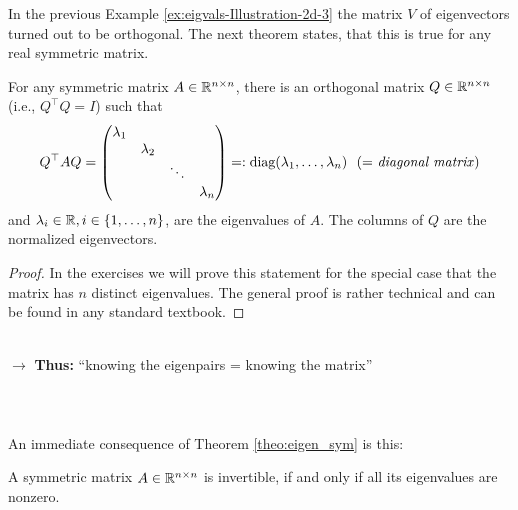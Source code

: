 \begin{frame}
In the previous Example \ref{ex:eigvals-Illustration-2d-3} the matrix $V$ of eigenvectors turned out to be orthogonal. The next theorem states, that this is true for any real symmetric matrix.
\begin{theo}\label{theo:eigen_sym}
	For any symmetric matrix $A\in{\mathbb{R}}^{n\times n}$, there is an orthogonal matrix $Q\in{\mathbb{R}}^{n\times n}$ (i.e., $Q^\top Q=I$) such that
	$$
	Q^\top AQ=\begin{pmatrix}
	\lambda_1 \\
	&\lambda_2\\
	&&\ddots\\
	&&&\lambda_n
	\end{pmatrix} =: \text{diag}(\lambda_1,\ldots,\lambda_n)
	\text{~~(=~\textit{diagonal matrix})}
	$$
	and $\lambda_i\in{\mathbb{R}},i \in \{1,\ldots, n\}$, are the eigenvalues of $A$. The columns of $Q$ are the normalized eigenvectors.
\end{theo}
\begin{proof}
	In the exercises we will prove this statement for the special case that the matrix has $n$ distinct eigenvalues. The general proof is rather technical and can be found in any standard textbook.
\end{proof}
~\\
$\rightarrow$ \textbf{Thus:} ``knowing the eigenpairs = knowing the matrix''\\
~\\~\\~\\
An immediate consequence of Theorem \ref{theo:eigen_sym} is this: \vspace{-0.3cm}
\begin{corollary} A symmetric matrix $A\in{\mathbb{R}}^{n\times n}$ is invertible, if and only if all its eigenvalues are nonzero.
\end{corollary}

\end{frame}
 
